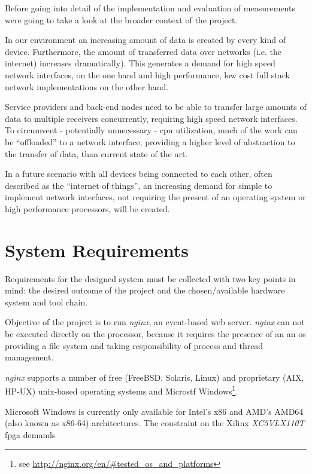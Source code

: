 Before going into detail of the implementation and evaluation of measurements were going to take a look at the broader context of the project.

In our environment an increasing amount of data is created by every kind of device. Furthermore, the amount of transferred data over networks (i.e. the internet) increases dramatically). This generates a demand for high speed network interfaces, on the one hand and high performance, low cost full stack network implementations on the other hand. 

Service providers and back-end nodes need to be able to transfer large amounts of data to multiple receivers concurrently, requiring high speed network interfaces. To circumvent - potentially unnecessary - \gls{cpu} utilization, much of the work can be "`offloaded"' to a network interface, providing a higher level of abstraction to the transfer of data, than current state of the art.

In a future scenario with all devices being connected to each other, often described as the "`internet of things"', an increasing demand for simple to implement network interfaces, not requiring the present of an operating system or high performance processors, will be created.

\chapter{System Requirements}

Requirements for the designed system must be collected with two key points in mind: the desired outcome of the project and the chosen/available hardware system and tool chain.

Objective of the project is to run \textit{nginx}, an event-based web server. \textit{nginx} can not be executed directly on the processor, because it requires the presence of an an \gls{os} providing a file system and taking responsibility of process and thread management. 

\textit{nginx} supports a number of free (FreeBSD, Solaris, Linux) and proprietary (AIX, HP-UX) unix-based operating systems and Microstf Windows\footnote{see \url{http://nginx.org/en/\#tested_os_and_platforms}}.

Microsoft Windows is currently only available for Intel's x86 and AMD's AMD64 (also known as x86-64) architectures. The constraint on the Xilinx  \textit{XC5VLX110T} \gls{fpga} demands 






